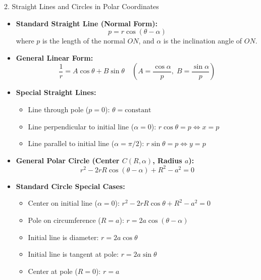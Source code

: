 \documentclass[11pt,a4paper]{article}
\begin{document}
\begin{defbox}{2. Straight Lines and Circles in Polar Coordinates}
\begin{itemize}
    \item \textbf{Standard Straight Line (Normal Form):}
    \begin{equation*}
        p = r\cos(\theta - \alpha)
    \end{equation*}
    where $p$ is the length of the normal $ON$, and $\alpha$ is the inclination angle of $ON$.
    \item \textbf{General Linear Form:}
    \begin{equation*}
        \frac{1}{r} = A\cos\theta + B\sin\theta \quad \left(A = \frac{\cos\alpha}{p}, \; B = \frac{\sin\alpha}{p}\right)
    \end{equation*}
    \item \textbf{Special Straight Lines:}
    \begin{itemize}
        \item Line through pole ($p = 0$): $\theta = \text{constant}$
        \item Line perpendicular to initial line ($\alpha = 0$): $r\cos\theta = p \iff x = p$
        \item Line parallel to initial line ($\alpha = \pi/2$): $r\sin\theta = p \iff y = p$
    \end{itemize}
    \item \textbf{General Polar Circle (Center $C(R, \alpha)$, Radius $a$):}
    \begin{equation*}
        r^2 - 2rR\cos(\theta - \alpha) + R^2 - a^2 = 0
    \end{equation*}
    \item \textbf{Standard Circle Special Cases:}
    \begin{itemize}
        \item Center on initial line ($\alpha = 0$): $r^2 - 2rR\cos\theta + R^2 - a^2 = 0$
        \item Pole on circumference ($R = a$): $r = 2a\cos(\theta - \alpha)$
        \item Initial line is diameter: $r = 2a\cos\theta$
        \item Initial line is tangent at pole: $r = 2a\sin\theta$
        \item Center at pole ($R = 0$): $r = a$
    \end{itemize}
\end{itemize}
\end{defbox}
\end{document}
